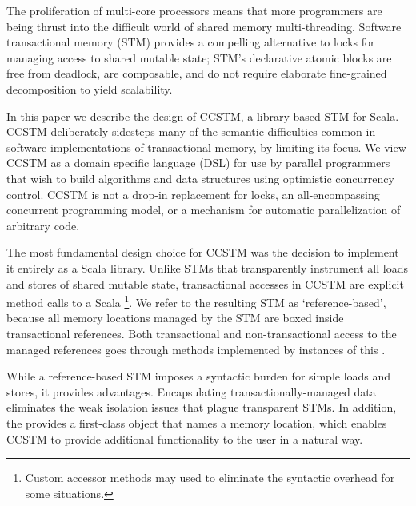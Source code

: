 The proliferation of multi-core processors means that more programmers are
being thrust into the difficult world of shared memory multi-threading.
Software transactional memory (STM) provides a compelling alternative to
locks for managing access to shared mutable state; STM's declarative
atomic blocks are free from deadlock, are composable, and do not
require elaborate fine-grained decomposition to yield scalability.


In this paper we describe the design of CCSTM, a library-based STM
for Scala.  CCSTM deliberately sidesteps many of the 
semantic difficulties common in software implementations of transactional
memory, by limiting its focus.  We view CCSTM as a domain specific language
(DSL)
for use by parallel programmers that wish to build algorithms and data
structures using optimistic concurrency control.  CCSTM is not a drop-in replacement for
locks, an all-encompassing concurrent programming model, or a mechanism
for automatic parallelization of arbitrary code.

The most fundamental design choice for CCSTM was the decision to implement
it entirely as a Scala library.  Unlike STMs that transparently instrument
all loads and stores of shared mutable state, transactional accesses in
CCSTM are explicit method calls to a Scala \footnote{Custom
accessor methods may used to eliminate the syntactic overhead for some
situations.}.  We refer to the resulting STM as `reference-based',
because all memory locations managed by the STM are boxed inside
transactional references.  Both transactional and non-transactional
access to the managed references goes through methods implemented by
instances of this .

While a reference-based STM imposes a syntactic burden for simple loads
and stores, it provides advantages.  Encapsulating transactionally-managed
data eliminates the weak isolation issues that plague transparent STMs.
In addition, the  provides a first-class object that names a
memory location, which enables CCSTM to provide additional functionality
to the user in a natural way.

